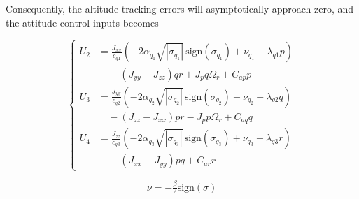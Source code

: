 \begin{small}
\begin{enumerate}
\noindent Consequently, the altitude tracking errors will asymptotically approach zero, and the attitude control inputs becomes
\begin{small}
\begin{equation}
\left\{
\begin{aligned}
U_2 &= \frac{J_{xx}}{c_{q1}} \left( -2\alpha_{q_1}\sqrt{|\sigma_{q_1}|}\,\text{sign}(\sigma_{q_1}) + \nu_{q_1} - \lambda_{q1} p \right) \\
&\quad - (J_{yy} - J_{zz}) q r + J_p q \Omega_r + C_{ap} p \\[6pt]
U_3 &= \frac{J_{yy}}{c_{q2}} \left( -2\alpha_{q_2}\sqrt{|\sigma_{q_2}|}\,\text{sign}(\sigma_{q_2}) + \nu_{q_2} - \lambda_{q2} q \right) \\
&\quad - (J_{zz} - J_{xx}) p r - J_p p \Omega_r + C_{aq} q \\[6pt]
U_4 &= \frac{J_{zz}}{c_{q3}} \left( -2\alpha_{q_3}\sqrt{|\sigma_{q_3}|}\,\text{sign}(\sigma_{q_3}) + \nu_{q_3} - \lambda_{q3} r \right) \\
&\quad - (J_{xx} - J_{yy}) p q + C_{ar} r
\end{aligned} 
\right.
\end{equation}
\end{small}

\[
\dot{\nu} = -\tfrac{\beta}{2}\text{sign}(\sigma)
\]









\end{enumerate}
\end{small}
